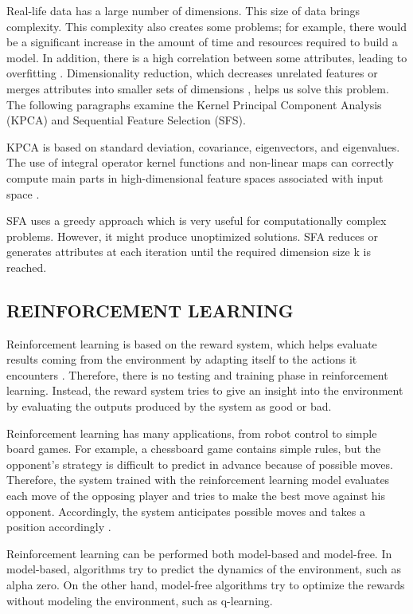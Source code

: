 Real-life data has a large number of dimensions. This size of data brings complexity. This complexity also creates some problems; for example, there would be a significant increase in the amount of time and resources required to build a model. In addition, there is a high correlation between some attributes, leading to overfitting \cite{sonawale2015dimensionality}. Dimensionality reduction, which decreases unrelated features or merges attributes into smaller sets of dimensions \cite{biricik2012comparing}, helps us solve this problem. The following paragraphs examine the Kernel Principal Component Analysis (KPCA) and Sequential Feature Selection (SFS). 

KPCA is based on standard deviation, covariance, eigenvectors, and eigenvalues. The use of integral operator kernel functions and non-linear maps can correctly compute main parts in high-dimensional feature spaces associated with input space \cite{scholkopf1997kernel}.

SFA uses a greedy approach which is very useful for computationally complex problems. However, it might produce unoptimized solutions. SFA reduces or generates attributes at each iteration until the required dimension size k is reached.

\subsection{REINFORCEMENT LEARNING}

Reinforcement learning is based on the reward system, which helps evaluate results coming from the environment by adapting itself to the actions it encounters  \cite{sutton2018reinforcement}. Therefore, there is no testing and training phase in reinforcement learning. Instead, the reward system tries to give an insight into the environment by evaluating the outputs produced by the system as good or bad.

Reinforcement learning has many applications, from robot control to simple board games. For example, a chessboard game contains simple rules, but the opponent's strategy is difficult to predict in advance because of possible moves. Therefore, the system trained with the reinforcement learning model evaluates each move of the opposing player and tries to make the best move against his opponent. Accordingly, the system anticipates possible moves and takes a position accordingly \cite{alpaydin2020introduction}.

Reinforcement learning can be performed both model-based and model-free. In model-based, algorithms try to predict the dynamics of the environment, such as alpha zero. On the other hand, model-free algorithms try to optimize the rewards without modeling the environment, such as q-learning.


